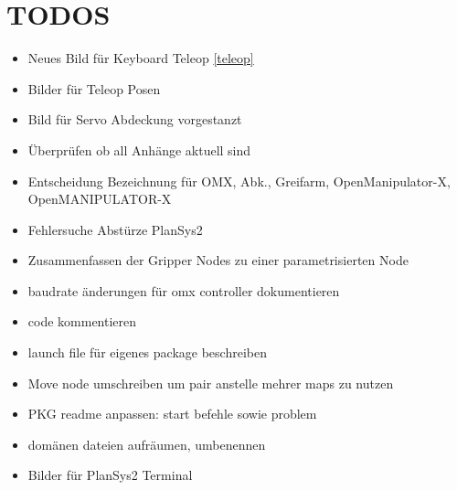 \section{TODOS}
\begin{itemize}
\item Neues Bild für Keyboard Teleop \ref{teleop}
\item Bilder für Teleop Posen
\item Bild für Servo Abdeckung vorgestanzt
\item Überprüfen ob all Anhänge aktuell sind
\item Entscheidung Bezeichnung für OMX, Abk., Greifarm, OpenManipulator-X, OpenMANIPULATOR-X
\item Fehlersuche Abstürze PlanSys2
\item Zusammenfassen der Gripper Nodes zu einer parametrisierten Node
\item baudrate änderungen für omx controller dokumentieren
\item code kommentieren
\item launch file für eigenes package beschreiben
\item Move node umschreiben um pair anstelle mehrer maps zu nutzen 
\item PKG readme anpassen: start befehle sowie problem
\item domänen dateien aufräumen, umbenennen
\item Bilder für PlanSys2 Terminal
\end{itemize}